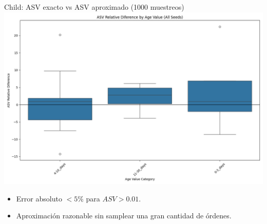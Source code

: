 \begin{frame}{Child: ASV exacto vs ASV aproximado (1000 muestreos)}
	\includegraphics[width=0.8\linewidth]{pic/img/asvResults/ChildAllSeedsASVBoxplot.png}
	\vspace{0.5em}
	\begin{itemize}
		\item Error absoluto $< 5\%$ para $ASV > 0.01$.
		\item Aproximaci\'on razonable sin samplear una gran cantidad de órdenes.
	\end{itemize}
\end{frame}
